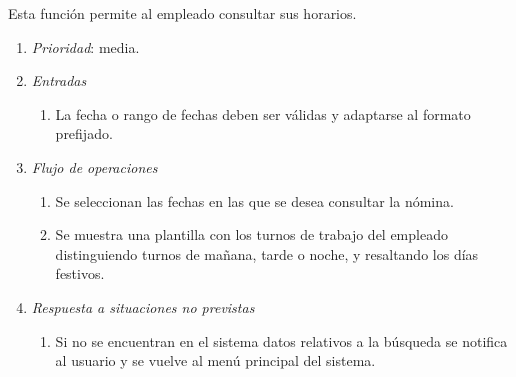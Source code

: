 

	Esta función permite al empleado consultar sus horarios.

	\begin{enumerate}
		\item \textit{Prioridad}: media.
		\item \textit{Entradas}
		\begin{enumerate}
			\item La fecha o rango de fechas deben ser válidas y adaptarse al formato prefijado.
		\end{enumerate}
		\item \textit{Flujo de operaciones}
		\begin{enumerate}
			\item Se seleccionan las fechas en las que se desea consultar la nómina.
			\item Se muestra una plantilla con los turnos de trabajo del empleado distinguiendo turnos de mañana, tarde o noche, y resaltando los días festivos.
		\end{enumerate}
		\item \textit{Respuesta a situaciones no previstas}
		\begin{enumerate}
			\item Si no se encuentran en el sistema datos relativos a la búsqueda se notifica al usuario y se vuelve al menú principal del sistema.
		\end{enumerate}
	\end{enumerate}
